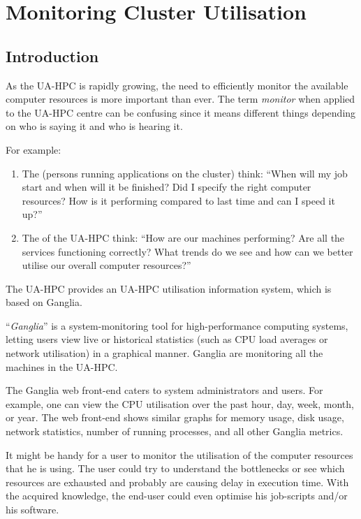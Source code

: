 \chapter{Monitoring Cluster Utilisation}
\label{ch:monitoring-cluster-utilization}

\section{Introduction}

As the UA-HPC is rapidly growing, the need to efficiently monitor the available
computer resources is more important than ever. The term \emph{monitor} when
applied to the UA-HPC centre can be confusing since it means different things
depending on who is saying it and who is hearing it.

For example:

\begin{enumerate}
\item  The  (persons running applications on the cluster) think: ``When will my job start and when will it be finished? Did I specify the right computer resources?  How is it performing compared to last time and can I speed it up?''
\item  The  of the UA-HPC think: ``How are our machines performing? Are all the services functioning correctly? What trends do we see and how can we better utilise our overall computer resources?''
\end{enumerate}

The UA-HPC provides an UA-HPC utilisation information system, which is based on Ganglia.

``\emph{Ganglia}'' is a system-monitoring tool for high-performance computing
systems, letting users view live or historical statistics (such as CPU load
averages or network utilisation) in a graphical manner. Ganglia are monitoring
all the machines in the UA-HPC.

The Ganglia web front-end caters to system administrators and users. For
example, one can view the CPU utilisation over the past hour, day, week, month,
or year. The web front-end shows similar graphs for memory usage, disk usage,
network statistics, number of running processes, and all other Ganglia metrics.

It might be handy for a user to monitor the utilisation of the computer
resources that he is using. The user could try to understand the bottlenecks or
see which resources are exhausted and probably are causing delay in execution
time. With the acquired knowledge, the end-user could even optimise his
job-scripts and/or his software.

